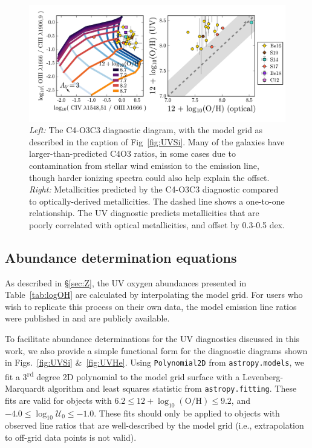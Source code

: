 \documentclass[preprint2]{aastex62}
\newcommand{\civ}{\ion{C}{4}}
\newcommand{\logten}{\ensuremath{\log_{10}}}
\newcommand{\logOH}{\ensuremath{\logten (\mathrm{O}/\mathrm{H})}\xspace}
\newcommand{\logU}{\ensuremath{\logten \mathcal{U}_0}}
\begin{document}
\begin{figure}
  \begin{center}
    \includegraphics[width=\linewidth]{figs/f5.png}
    \caption{\emph{Left:} The C4-O3C3 diagnostic diagram, with the model grid as described in the caption of Fig~\ref{fig:UVSi}. Many of the galaxies have larger-than-predicted C4O3 ratios, in some cases due to contamination from stellar wind emission to the \civ{} emission line, though harder ionizing spectra could also help explain the offset. \emph{Right:} Metallicities predicted by the C4-O3C3 diagnostic compared to optically-derived metallicities. The dashed line shows a one-to-one relationship. The UV diagnostic predicts metallicities that are poorly correlated with optical metallicities, and offset by 0.3-0.5 dex.}
    \label{fig:UVCIV}
  \end{center}
\end{figure}
\subsection{Abundance determination equations}\label{sec:ZZ:poly}
As described in \S\ref{sec:Z}, the UV oxygen abundances presented in Table~\ref{tab:logOH} are calculated by interpolating the model grid. For users who wish to replicate this process on their own data, the model emission line ratios were published in  and are publicly available.

To facilitate abundance determinations for the UV diagnostics discussed in this work, we also provide a simple functional form for the diagnostic diagrams shown in Figs.~\ref{fig:UVSi} \&~\ref{fig:UVHe}. Using {\tt Polynomial2D} from {\tt astropy.models}, we fit a 3\textsuperscript{rd} degree 2D polynomial to the model grid surface with a Levenberg-Marquardt algorithm and least squares statistic from {\tt astropy.fitting}. These fits are valid for objects with $6.2 \leq 12+\logOH \leq 9.2$, and $-4.0 \leq \logU \leq -1.0$. These fits should only be applied to objects with observed line ratios that are well-described by the model grid (i.e., extrapolation to off-grid data points is not valid).
\end{document}
